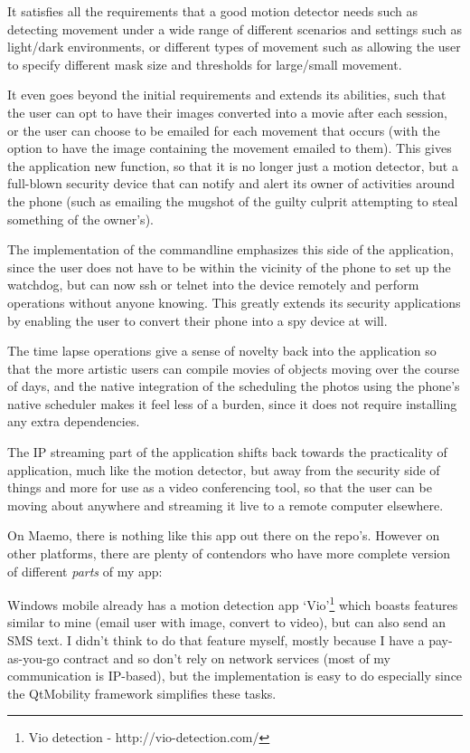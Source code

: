 \documentclass[11pt]{article} %
\begin{document}
It satisfies all the requirements that a good motion detector needs such as detecting movement under a wide range of different scenarios and settings such as light/dark environments, or different types of movement such as allowing the user to specify different mask size and thresholds for large/small movement.

It even goes beyond the initial requirements and extends its abilities, such that the user can opt to have their images converted into a movie after each session, or the user can choose to be emailed for each movement that occurs (with the option to have the image containing the movement emailed to them). This gives the application new function, so that it is no longer just a motion detector, but a full-blown security device that can notify and alert its owner of activities around the phone (such as emailing the mugshot of the guilty culprit attempting to steal something of the owner’s).

The implementation of the commandline emphasizes this side of the application, since the user does not have to be within the vicinity of the phone to set up the watchdog, but can now ssh or telnet into the device remotely and perform operations without anyone knowing. This greatly extends its security applications by enabling the user to convert their phone into a spy device at will.

The time lapse operations give a sense of novelty back into the application so that the more artistic users can compile movies of objects moving over the course of days, and the native integration of the scheduling the photos using the phone’s native scheduler makes it feel less of a burden, since it does not require installing any extra dependencies.

The IP streaming part of the application shifts back towards the practicality of application, much like the motion detector, but away from the security side of things and more for use as a video conferencing tool, so that the user can be moving about anywhere and streaming it live to a remote computer elsewhere.

On Maemo, there is nothing like this app out there on the repo’s. However on other platforms, there are plenty of contendors who have more complete version of different {\it parts} of my app:

Windows mobile already has a motion detection app ‘Vio’\footnote{Vio detection - http://vio-detection.com/}\label{ref:vio} which boasts features similar to mine (email user with image, convert to video), but can also send an SMS text.  I didn’t think to do that feature myself, mostly because  I have a pay-as-you-go contract and so don’t rely on network services (most of my communication is IP-based), but the implementation is easy to do especially since the QtMobility framework simplifies these tasks. 
\end{document}
